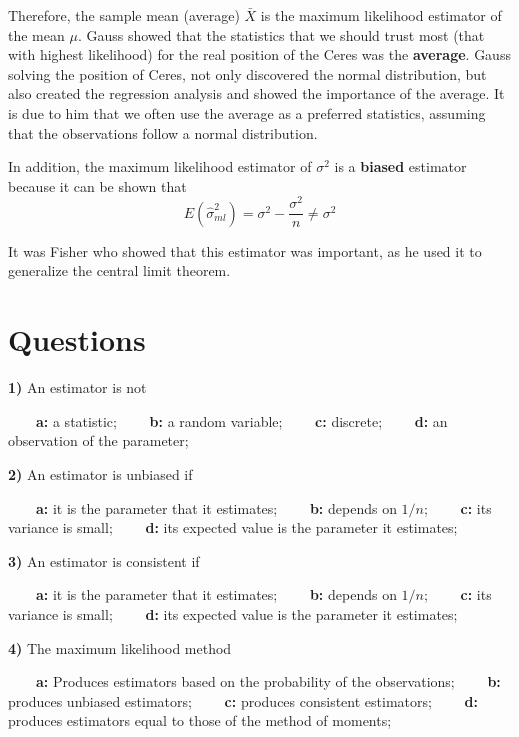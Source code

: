 \documentclass[
]{book}
\begin{document}
Therefore, the sample mean (average) \(\bar{X}\) is the maximum likelihood estimator of the mean \(\mu\). Gauss showed that the statistics that we should trust most (that with highest likelihood) for the real position of the Ceres was the \textbf{average}. Gauss solving the position of Ceres, not only discovered the normal distribution, but also created the regression analysis and showed the importance of the average. It is due to him that we often use the average as a preferred statistics, assuming that the observations follow a normal distribution.

In addition, the maximum likelihood estimator of \(\sigma^2\) is a \textbf{biased} estimator because it can be shown that \[E(\hat{\sigma}^2_{ml})=\sigma^2-\frac{\sigma^2}{n}\neq \sigma^2\]

It was Fisher who showed that this estimator was important, as he used it to generalize the central limit theorem.

\hypertarget{questions-9}{%
\section{Questions}\label{questions-9}}

\textbf{1)} An estimator is not

\textbf{\(\qquad\)a:} a statistic;
\textbf{\(\qquad\)b:} a random variable;
\textbf{\(\qquad\)c:} discrete;
\textbf{\(\qquad\)d:} an observation of the parameter;

\textbf{2)} An estimator is unbiased if

\textbf{\(\qquad\)a:} it is the parameter that it estimates;
\textbf{\(\qquad\)b:} depends on \(1/n\);
\textbf{\(\qquad\)c:} its variance is small;
\textbf{\(\qquad\)d:} its expected value is the parameter it estimates;

\textbf{3)} An estimator is consistent if

\textbf{\(\qquad\)a:} it is the parameter that it estimates;
\textbf{\(\qquad\)b:} depends on \(1/n\);
\textbf{\(\qquad\)c:} its variance is small;
\textbf{\(\qquad\)d:} its expected value is the parameter it estimates;

\textbf{4)} The maximum likelihood method

\textbf{\(\qquad\)a:} Produces estimators based on the probability of the observations;
\textbf{\(\qquad\)b:} produces unbiased estimators;
\textbf{\(\qquad\)c:} produces consistent estimators;
\textbf{\(\qquad\)d:} produces estimators equal to those of the method of moments;
\end{document}
